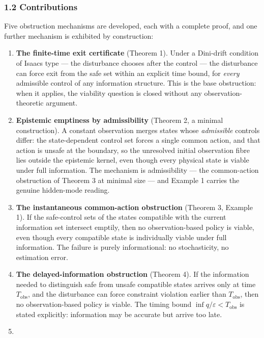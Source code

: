 \documentclass[11pt]{article}
\begin{document}
\subsubsection{1.2 Contributions}\label{contributions}

Five obstruction mechanisms are developed, each with a complete proof,
and one further mechanism is exhibited by construction:

\begin{enumerate}
\def\labelenumi{\arabic{enumi}.}
\item
  \textbf{The finite-time exit certificate} (Theorem 1). Under a
  Dini-drift condition of Isaacs type --- the disturbance chooses after
  the control --- the disturbance can force exit from the safe set
  within an explicit time bound, for \emph{every} admissible control of
  any information structure. This is the base obstruction: when it
  applies, the viability question is closed without any
  observation-theoretic argument.
\item
  \textbf{Epistemic emptiness by admissibility} (Theorem 2, a minimal
  construction). A constant observation merges states whose
  \emph{admissible} controls differ: the state-dependent control set
  forces a single common action, and that action is unsafe at the
  boundary, so the unresolved initial observation fibre lies outside the
  epistemic kernel, even though every physical state is viable under
  full information. The mechanism is admissibility --- the common-action
  obstruction of Theorem 3 at minimal size --- and Example 1 carries the
  genuine hidden-mode reading.
\item
  \textbf{The instantaneous common-action obstruction} (Theorem 3,
  Example 1). If the safe-control sets of the states compatible with the
  current information set intersect emptily, then no observation-based
  policy is viable, even though every compatible state is individually
  viable under full information. The failure is purely informational: no
  stochasticity, no estimation error.
\item
  \textbf{The delayed-information obstruction} (Theorem 4). If the
  information needed to distinguish safe from unsafe compatible states
  arrives only at time \(T_{\mathrm{obs}}\), and the disturbance can
  force constraint violation earlier than \(T_{\mathrm{obs}}\), then no
  observation-based policy is viable. The timing bound
  \(\inf q / \varepsilon < T_{\mathrm{obs}}\) is stated explicitly:
  information may be accurate but arrive too late.
\item

\end{enumerate}
\end{document}
